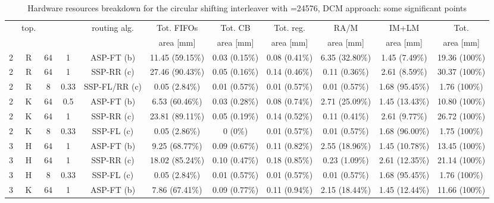 \documentclass[10pt,twocolumn,journal]{IEEEtran}
\begin{document}
\begin{table*}[t!]
  \centering
  \begin{threeparttable}[t]  
  \caption{Hardware resources breakdown for the circular shifting interleaver with =24576, DCM approach: some significant points} \label{tab:percentage}
  \begin{tabular}{|c|c|c|c|c|c|c|c|c|c|c|}
    \hline
 & top. &  &  & routing alg. & Tot. FIFOs    & Tot. CB       & Tot. reg.     & RA/M          & IM+LM & Tot. \\
    &      &     &     &            & area [mm] & area [mm] & area [mm] & area [mm] & area [mm] & area [mm] \\
    \hline 
\rowcolor[gray]{0.9} 2   & R    & 64  & 1   & ASP-FT (b) & 11.45 (59.15\%) & 0.03 (0.15\%) & 0.08 (0.41\%) & 6.35 (32.80\%) & 1.45 (7.49\%) & 19.36 (100\%) \\
\rowcolor[gray]{0.8} 2   & R    & 64  & 1   & SSP-RR (c) & 27.46 (90.43\%) & 0.05 (0.16\%) & 0.14 (0.46\%) & 0.11 (0.36\%) & 2.61 (8.59\%) & 30.37 (100\%) \\
\rowcolor[gray]{0.7} 2   & R    & 8   & 0.33 & SSP-FL/RR (c) & 0.05 (2.84\%) & 0.01 (0.57\%) & 0.01 (0.57\%) & 0.01 (0.57\%) & 1.68 (95.45\%) & 1.76 (100\%) \\
\rowcolor[gray]{0.9} 2   & K    & 64  & 0.5 & ASP-FT (b) & 6.53 (60.46\%) & 0.03 (0.28\%) & 0.08 (0.74\%) & 2.71 (25.09\%) & 1.45 (13.43\%) & 10.80 (100\%) \\
\rowcolor[gray]{0.8} 2   & K    & 64  & 1 & SSP-RR (c) & 23.81 (89.11\%) & 0.05 (0.19\%) & 0.14 (0.52\%) & 0.11 (0.41\%) & 2.61 (9.77\%) & 26.72 (100\%) \\
\rowcolor[gray]{0.7} 2   & K    & 8  & 0.33 & SSP-FL (c) & 0.05 (2.86\%) & 0 (0\%)\tnote{(1)} & 0.01 (0.57\%) & 0.01 (0.57\%) & 1.68 (96.00\%) & 1.75 (100\%) \\
\hline
\rowcolor[gray]{0.9} 3   & H    & 64  &  1  & ASP-FT (b) & 9.25 (68.77\%) & 0.09 (0.67\%) & 0.11 (0.82\%) & 2.55 (18.96\%) & 1.45 (10.78\%) & 13.45 (100\%) \\
\rowcolor[gray]{0.8} 3   & H    & 64  &  1  & SSP-RR (c) & 18.02 (85.24\%) & 0.10 (0.47\%) & 0.18 (0.85\%) & 0.23 (1.09\%) & 2.61 (12.35\%) & 21.14 (100\%) \\
\rowcolor[gray]{0.7} 3   & H    & 8  &  0.33  & SSP-FL (c) & 0.05 (2.84\%) & 0.01 (0.57\%) & 0.01 (0.57\%) & 0.01 (0.57\%) & 1.68 (95.45\%) & 1.76 (100\%) \\
\rowcolor[gray]{0.9} 3   & K    & 64  &  1  & ASP-FT (b) & 7.86 (67.41\%) & 0.09 (0.77\%) & 0.11 (0.94\%) & 2.15 (18.44\%) & 1.45 (12.44\%) & 11.66 (100\%) \\

\end{tabular}
\end{threeparttable}
\end{table*}
\end{document}
